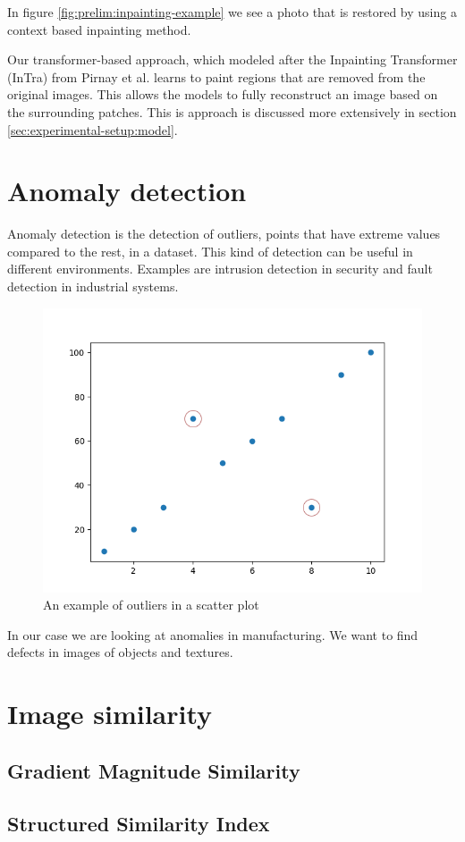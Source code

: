 In figure \ref{fig:prelim:inpainting-example} we see a photo that is restored by using a context based inpainting method.

Our transformer-based approach, which modeled after the Inpainting Transformer (InTra) from Pirnay et al. \cite{pirnay_inpainting_2021} learns to paint regions that are removed from the original images. This allows the models to fully reconstruct an image based on the surrounding patches. This is approach is discussed more extensively in section \ref{sec:experimental-setup:model}.

\section{Anomaly detection}
\label{sec:prelim:anomaly-detection}

Anomaly detection is the detection of outliers, points that have extreme values compared to the rest, in a dataset.
This kind of detection can be useful in different environments. Examples are intrusion detection in security and fault detection in industrial systems.

\begin{figure}[ht!]
\centering
\includegraphics[width=\textwidth]{imgs/outliers-example.png}
\caption{An example of outliers in a scatter plot}
\label{fig:prelim:outliers-example}
\end{figure}

In our case we are looking at anomalies in manufacturing. We want to find defects in images of objects and textures.

\section{Image similarity}


\subsection{Gradient Magnitude Similarity}


\subsection{Structured Similarity Index}


